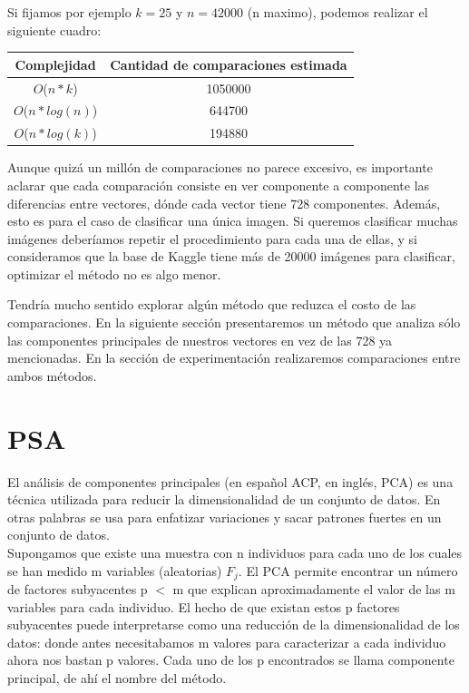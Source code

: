 Si fijamos por ejemplo $k = 25$ y $n = 42000$ (n maximo), podemos realizar el siguiente cuadro:

\begin{center}
    \begin{tabular}{| c | c |}
    \hline
    Complejidad   &  Cantidad de comparaciones estimada \\ \hline

    $O$($n * k$)            & 1050000  \\ \hline
    $O$($n * log(n)$)       & 644700  \\ \hline
    $O$($n * log(k)$)       & 194880   \\ \hline
    \end{tabular}
\end{center}

Aunque quizá un millón de comparaciones no parece excesivo, es importante aclarar que cada comparación consiste en ver componente a componente las diferencias entre vectores, dónde cada vector tiene 728 componentes. Además, esto es para el caso de clasificar una única imagen. Si queremos clasificar muchas imágenes deberíamos repetir el procedimiento para cada una de ellas, y si consideramos que la base de Kaggle tiene más de 20000 imágenes para clasificar, optimizar el método no es algo menor. \\



Tendría mucho sentido explorar algún método que reduzca el costo de las comparaciones. En la siguiente sección presentaremos un método que analiza sólo las componentes principales de nuestros vectores en vez de las 728 ya mencionadas. En la sección de experimentación realizaremos comparaciones entre ambos métodos. \\


\section{PSA}

El análisis de componentes principales (en español ACP, en inglés, PCA) es una técnica utilizada para reducir la dimensionalidad de un conjunto de datos.
En otras palabras se usa para enfatizar variaciones y sacar patrones fuertes en un conjunto de datos. \\

Supongamos que existe una muestra con n individuos para cada uno de los cuales se han medido m variables (aleatorias) $F_{j}$. El PCA permite encontrar un número de factores subyacentes p $<$ m que explican aproximadamente el valor de las m variables para cada individuo. El hecho de que existan estos p factores subyacentes puede interpretarse como una reducción de la dimensionalidad de los datos: donde antes necesitabamos m valores para caracterizar a cada individuo ahora nos bastan p valores. Cada uno de los p encontrados se llama componente principal, de ahí el nombre del método. \\

